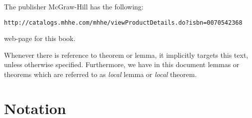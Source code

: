 The publisher  McGraw-Hill has the following:
\begin{center}
\texttt{http://catalogs.mhhe.com/mhhe/viewProductDetails.do?isbn=0070542368}
\end{center}
web-page for this book.


\begin{center}
Whenever there is reference to theorem or lemma, it implicitly
targets this text, unless otherwise specified.
Furthermore, we have in this document lemmas or theorems
which are referred to as \emph{local} lemma
or \emph{local} theorem.
\end{center}

\section*{Notation}




\iftrue
 
 
 
\else
\fi


% 



\printindex



